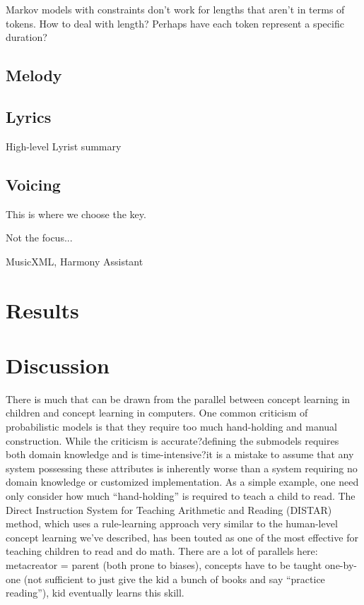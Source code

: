 \documentclass[letterpaper]{article}
\begin{document}
Markov models with constraints don't work for lengths that aren't in terms of tokens. How to deal with length? Perhaps have each token represent a specific duration?

\subsection{Melody}



\subsection{Lyrics}

High-level Lyrist summary



\subsection{Voicing}

This is where we choose the key.

Not the focus...

MusicXML, Harmony Assistant

\section{Results}

\section{Discussion}

There is much that can be drawn from the parallel between concept learning in children and concept learning in computers. One common criticism of probabilistic models is that they require too much hand-holding and manual construction. While the criticism is accurate?defining the submodels requires both domain knowledge and is time-intensive?it is a mistake to assume that any system possessing these attributes is inherently worse than a system requiring no domain knowledge or customized implementation. As a simple example, one need only consider how much ``hand-holding'' is required to teach a child to read. The Direct Instruction System for Teaching Arithmetic and Reading (DISTAR) method, which uses a rule-learning approach very similar to the human-level concept learning we've described, has been touted as one of the most effective for teaching children to read and do math. There are a lot of parallels here: metacreator = parent (both prone to biases), concepts have to be taught one-by-one (not sufficient to just give the kid a bunch of books and say ``practice reading''), kid eventually learns this skill.
\end{document}
